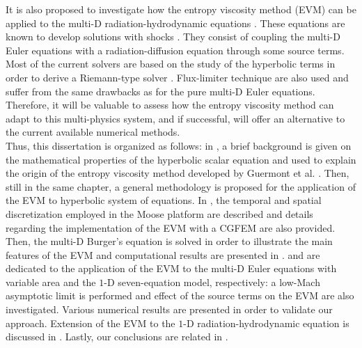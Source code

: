 It is also proposed to investigate how the entropy viscosity method (EVM) can be applied to the multi-D radiation-hydrodynamic equations \cite{LowrieMorelHittinger}. These equations are known to develop solutions with shocks \cite{Balsara}. They consist of coupling the multi-D Euler equations with a radiation-diffusion equation through some source terms.  Most of the current solvers are based on the study of the hyperbolic terms in order to derive a Riemann-type solver \cite{LowrieMorel}. Flux-limiter technique \cite{EdwardsMorelLowrie} are also used and suffer from the same drawbacks as for the pure multi-D Euler equations. Therefore, it will be valuable to assess how the entropy viscosity method can adapt to this multi-physics system, and if successful, will offer an alternative to the current available numerical methods.\\

Thus, this dissertation is organized as follows: in , a brief background is given on the mathematical properties of the hyperbolic scalar equation and used to explain the origin of the entropy viscosity method developed by Guermont et al. \cite{jlg1}. Then, still in the same chapter, a general methodology is proposed for the application of the EVM to hyperbolic system of equations. In , the temporal and spatial discretization employed in the Moose platform \cite{Moose} are described and details regarding the implementation of the EVM with a CGFEM are also provided. Then, the multi-D Burger's equation is solved in order to illustrate the main features of the EVM and computational results are presented in .  and  are dedicated to the application of the EVM to the multi-D Euler equations with variable area and the $1$-D seven-equation model, respectively: a low-Mach asymptotic limit is performed and effect of the source terms on the EVM are also investigated. Various numerical results are presented in order to validate our approach. Extension of the EVM to the $1$-D radiation-hydrodynamic equation is discussed in . Lastly, our conclusions are related in . \\

